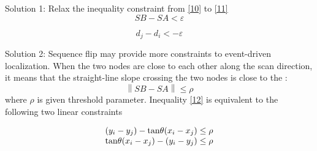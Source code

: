 Solution 1:
Relax the inequality constraint from \eqref{10} to \eqref{11}
 \begin{equation} \label{10}
{SB} - {SA} < \varepsilon
 \end{equation}

  \begin{equation} \label{11}
{d_j} - {d_i} < - \varepsilon
 \end{equation}


Solution 2:  Sequence flip may provide more constraints to event-driven localization. When the two nodes are close to each other along the scan direction, it means that the straight-line slope crossing the two nodes is close to the :
  \begin{equation} \label{12}
\left\| {SB - SA } \right\| \le \rho
 \end{equation}
where $\rho$ is given threshold parameter. Inequality \eqref{12} is equivalent to the following two linear constraints

\begin{eqnarray} \label{13}
\begin{array}{l}
 ({y_i} - {y_j}) - {\rm{tan}}\theta ({x_i} - {x_j}) \le \rho  \\
 {\rm{tan}}\theta ({x_i} - {x_j}) - ({y_i} - {y_j}) \le \rho  \\
 \end{array}
\end{eqnarray}











